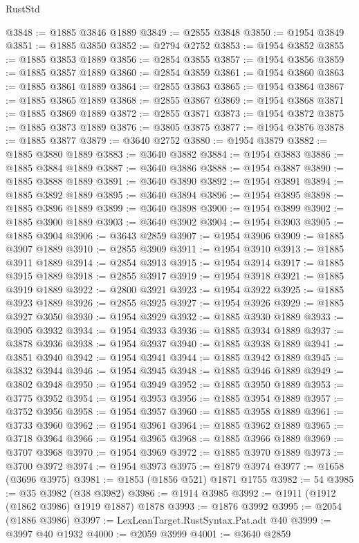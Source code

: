 \begin{lexlean}{RustStd}
\begin{coremodule}
@3848 := @1885 @3846 @1889
@3849 := @2855 @3848
@3850 := @1954 @3849
@3851 := @1885 @3850
@3852 := @2794 @2752
@3853 := @1954 @3852
@3855 := @1885 @3853 @1889
@3856 := @2854 @3855
@3857 := @1954 @3856
@3859 := @1885 @3857 @1889
@3860 := @2854 @3859
@3861 := @1954 @3860
@3863 := @1885 @3861 @1889
@3864 := @2855 @3863
@3865 := @1954 @3864
@3867 := @1885 @3865 @1889
@3868 := @2855 @3867
@3869 := @1954 @3868
@3871 := @1885 @3869 @1889
@3872 := @2855 @3871
@3873 := @1954 @3872
@3875 := @1885 @3873 @1889
@3876 := @3805 @3875
@3877 := @1954 @3876
@3878 := @1885 @3877
@3879 := @3640 @2752
@3880 := @1954 @3879
@3882 := @1885 @3880 @1889
@3883 := @3640 @3882
@3884 := @1954 @3883
@3886 := @1885 @3884 @1889
@3887 := @3640 @3886
@3888 := @1954 @3887
@3890 := @1885 @3888 @1889
@3891 := @3640 @3890
@3892 := @1954 @3891
@3894 := @1885 @3892 @1889
@3895 := @3640 @3894
@3896 := @1954 @3895
@3898 := @1885 @3896 @1889
@3899 := @3640 @3898
@3900 := @1954 @3899
@3902 := @1885 @3900 @1889
@3903 := @3640 @3902
@3904 := @1954 @3903
@3905 := @1885 @3904
@3906 := @3643 @2859
@3907 := @1954 @3906
@3909 := @1885 @3907 @1889
@3910 := @2855 @3909
@3911 := @1954 @3910
@3913 := @1885 @3911 @1889
@3914 := @2854 @3913
@3915 := @1954 @3914
@3917 := @1885 @3915 @1889
@3918 := @2855 @3917
@3919 := @1954 @3918
@3921 := @1885 @3919 @1889
@3922 := @2800 @3921
@3923 := @1954 @3922
@3925 := @1885 @3923 @1889
@3926 := @2855 @3925
@3927 := @1954 @3926
@3929 := @1885 @3927 @3050
@3930 := @1954 @3929
@3932 := @1885 @3930 @1889
@3933 := @3905 @3932
@3934 := @1954 @3933
@3936 := @1885 @3934 @1889
@3937 := @3878 @3936
@3938 := @1954 @3937
@3940 := @1885 @3938 @1889
@3941 := @3851 @3940
@3942 := @1954 @3941
@3944 := @1885 @3942 @1889
@3945 := @3832 @3944
@3946 := @1954 @3945
@3948 := @1885 @3946 @1889
@3949 := @3802 @3948
@3950 := @1954 @3949
@3952 := @1885 @3950 @1889
@3953 := @3775 @3952
@3954 := @1954 @3953
@3956 := @1885 @3954 @1889
@3957 := @3752 @3956
@3958 := @1954 @3957
@3960 := @1885 @3958 @1889
@3961 := @3733 @3960
@3962 := @1954 @3961
@3964 := @1885 @3962 @1889
@3965 := @3718 @3964
@3966 := @1954 @3965
@3968 := @1885 @3966 @1889
@3969 := @3707 @3968
@3970 := @1954 @3969
@3972 := @1885 @3970 @1889
@3973 := @3700 @3972
@3974 := @1954 @3973
@3975 := @1879 @3974
@3977 := @1658 (@3696 @3975)
@3981 := @1853 (@1856 @521) @1871 @1755
@3982 := 54
@3985 := @35 @3982 (@38 @3982)
@3986 := @1914 @3985
@3992 := @1911 (@1912 (@1862 @3986) @1919 @1887) @1878
@3993 := @1876 @3992
@3995 := @2054 (@1886 @3986)
@3997 := LexLeanTarget.RustSyntax.Pat.adt @40
@3999 := @3997 @40 @1932
@4000 := @2059 @3999
@4001 := @3640 @2859

\end{coremodule}
\end{lexlean}
